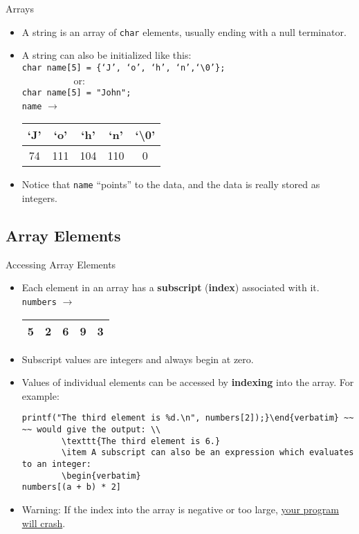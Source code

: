 \documentclass[graphics]{beamer}
\begin{document}
\begin{frame}{Arrays}
{\begin{itemize}
            \item A string is an array of \texttt{char} elements, usually ending with a null terminator.
            \item A string can also be initialized like this:\\ \texttt{char name[5] = \{`J', `o', `h', `n',`\textbackslash0'\};} \\ ~~ ~~ ~~ ~~ or: \\
            \texttt{char name[5] = "John";} \\
            \texttt{name} $\rightarrow$
            \begin{tabular}{|c|c|c|c|c|}
                \hline
                `J' & `o' & `h' & `n' & `\textbackslash0' \\
                \hline
                74 & 111 & 104 & 110 & 0 \\
                \hline
            \end{tabular}
            \item Notice that \texttt{name} ``points'' to the data, and the data is really stored as integers.
        \end{itemize}
    }
\end{frame}

\subsection{Array Elements}
\begin{frame}[fragile]{Accessing Array Elements}
    \begin{itemize}
        \item Each element in an array has a \textbf{subscript} (\textbf{index}) associated with it.
        \texttt{numbers} $\rightarrow$
        \begin{tabular}{|c|c|c|c|c|}
            \hline
            5 & 2 & 6 & 9 & 3 \\
            \hline
        \end{tabular}
        \item Subscript values are integers and always begin at zero.
        \item Values of individual elements can be accessed by \textbf{indexing} into the array. For example: 
        \begin{verbatim}
printf("The third element is %d.\n", numbers[2]);}\end{verbatim} ~~ ~~ would give the output: \\
        \texttt{The third element is 6.}
        \item A subscript can also be an expression which evaluates to an integer:
        \begin{verbatim}
numbers[(a + b) * 2]\end{verbatim}
        \item Warning: If the index into the array is negative or too large, \underline{your program will crash}.
    \end{itemize}
\end{frame}
\end{document}
